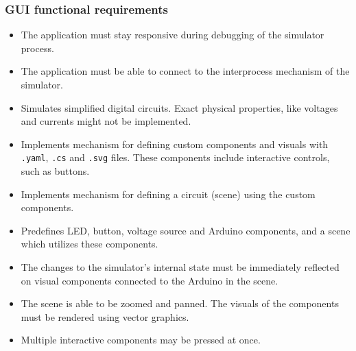 \subsubsection{GUI functional requirements}
\begin{itemize}
    \item The application must stay responsive during debugging of the simulator process.
    \item The application must be able to connect to the interprocess mechanism of the simulator.
    \item Simulates simplified digital circuits. Exact physical properties, like voltages and currents might not be implemented.
    \item Implements mechanism for defining custom components and visuals with \texttt{.yaml}, \texttt{.cs} and \texttt{.svg} files. These components include interactive controls, such as buttons.
    \item Implements mechanism for defining a circuit (scene) using the custom components.
    \item Predefines LED, button, voltage source and Arduino components, and a scene which utilizes these components.
    \item The changes to the simulator's internal state must be immediately reflected on visual components connected to the Arduino in the scene.
    \item The scene is able to be zoomed and panned. The visuals of the components must be rendered using vector graphics.
    \item Multiple interactive components may be pressed at once.
\end{itemize}